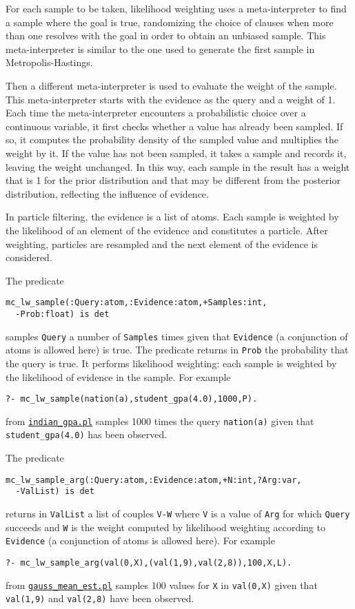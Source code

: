 For each sample to be taken, likelihood weighting
uses a meta-interpreter to find a sample where
the goal is true, randomizing the choice of
clauses when more than one resolves with the goal
in order to obtain an unbiased sample.
This meta-interpreter is similar to the one used
to generate the first sample in Metropolis-Hastings.

Then a different meta-interpreter is used to evaluate
the weight of the sample.
This meta-interpreter starts with the evidence as the query and a weight of 1. Each time the meta-interpreter encounters
a probabilistic choice over a continuous variable, it first checks whether a
value has already been sampled.
If so, it computes the probability density of the sampled value and multiplies the weight by it. If the value has not been sampled, it takes a sample and records it,
leaving the weight unchanged.
In this way, each sample in the result has a weight that is 1 for the prior distribution and that may be different from the posterior distribution,
reflecting the influence of evidence.

In particle filtering, the evidence is a list of atoms. Each sample is weighted by the
likelihood of an element of the evidence and constitutes a particle.
After weighting, particles are resampled and the next element of the evidence
is considered.

 The predicate
\begin{verbatim}
mc_lw_sample(:Query:atom,:Evidence:atom,+Samples:int,
  -Prob:float) is det
\end{verbatim}
samples \verb|Query|  a number of \verb|Samples| times given that \verb|Evidence|
(a conjunction of atoms is allowed here) is true.
The predicate returns in \verb|Prob| the probability that the query is true.
It performs likelihood weighting: each sample is weighted by the
likelihood of evidence in the sample.
For example
\begin{verbatim}
?- mc_lw_sample(nation(a),student_gpa(4.0),1000,P).
\end{verbatim}
from \href{http://cplint.eu/e/indian_gpa.pl}{\texttt{indian\_gpa.pl}} samples 1000 times the query
\verb|nation(a)| given that \verb|student_gpa(4.0)| has been observed.


 The predicate
\begin{verbatim}
mc_lw_sample_arg(:Query:atom,:Evidence:atom,+N:int,?Arg:var,
  -ValList) is det
\end{verbatim}
returns in \verb|ValList| a list of couples \verb|V-W| where \verb|V| is a value of \verb|Arg|
for which \verb|Query| succeeds and \verb|W| is the
weight computed by likelihood weighting
according to \verb|Evidence| (a conjunction of atoms is allowed here).
For example
\begin{verbatim}
?- mc_lw_sample_arg(val(0,X),(val(1,9),val(2,8)),100,X,L).
\end{verbatim}
from \href{http://cplint.eu/e/gauss_mean_est.pl}{\texttt{gauss\_mean\_est.pl}} samples 100 values for \verb|X| in
\verb|val(0,X)| given that \verb|val(1,9)| and \verb|val(2,8)| have been observed.

